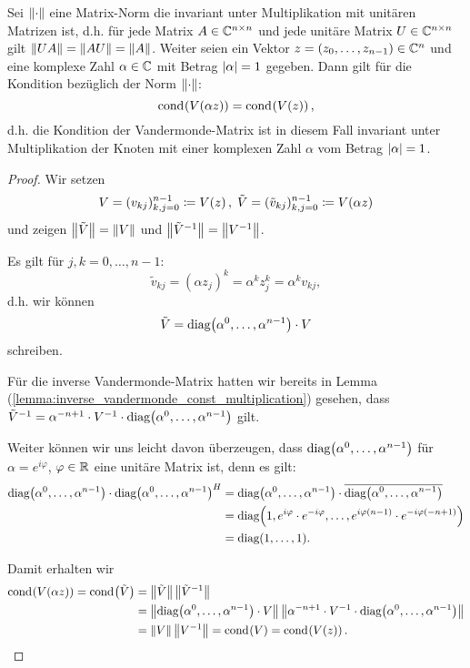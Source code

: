 \begin{lemma}
    Sei $\left\lVert \cdot \right\rVert$ eine Matrix-Norm die invariant unter Multiplikation mit unitären
    Matrizen ist, d.h. für jede Matrix $A \in \mathbb{C}^{n\times n}$ und jede
    unitäre Matrix $U \in \mathbb{C}^{n\times n}$ gilt $\left\lVert UA \right\rVert = \left\lVert AU \right\rVert = \left\lVert A \right\rVert$.
    Weiter seien ein Vektor $z = (z_0, \dots, z_{n-1}) \in \mathbb{C}^n$ und eine
    komplexe Zahl $\alpha \in \mathbb{C}$ mit Betrag $\left\lvert \alpha \right\rvert = 1$ gegeben.
    Dann gilt für die Kondition bezüglich der Norm $\left\lVert \cdot \right\rVert$:
    \[
        \text{cond}_{{}}\! \left( V \! \left( \alpha z \right) \right) = \text{cond}_{{}}\! \left( V \! \left( z \right) \right),
    \]
    d.h. die Kondition der Vandermonde-Matrix ist in diesem Fall invariant
    unter Multiplikation der Knoten mit einer komplexen Zahl $\alpha$ vom
    Betrag $\left\lvert \alpha \right\rvert = 1$.
\end{lemma}
\begin{proof}
    Wir setzen
    \[
        V = (v_{kj})_{k,j=0}^{n-1} \coloneqq V \! \left( z \right), \;
        \tilde{V} = (\tilde{v}_{kj})_{k,j=0}^{n-1} \coloneqq V \! \left( \alpha z \right)
    \]
    und zeigen $\left\lVert \tilde{V} \right\rVert = \left\lVert V \right\rVert$ und
    $\left\lVert \tilde{V}^{-1} \right\rVert = \left\lVert V^{-1} \right\rVert$.

    \noindent Es gilt für $j,k = 0,\dots,n-1$:
    \[
        \tilde{v}_{kj} = (\alpha z_j)^k = \alpha^k z_j^k = \alpha^k v_{kj},
    \]
    d.h. wir können
    \[
        \tilde{V} = \text{diag$ \left( \alpha^0, \dots, \alpha^{n-1} \right)$} \cdot V
    \]
    schreiben.

    \noindent Für die inverse Vandermonde-Matrix hatten wir bereits in
    Lemma (\ref{lemma:inverse_vandermonde_const_multiplication})
    gesehen, dass $ \tilde{V}^{-1} = \alpha^{-n+1} \cdot V^{-1} \cdot \text{diag$ \left( \alpha^{0}, \dots, \alpha^{n-1} \right)$} $ gilt.

    \noindent Weiter können wir uns leicht davon überzeugen, dass
    $\text{diag$ \left( \alpha^0, \dots, \alpha^{n-1} \right)$}$
    für $\alpha = e^{i\varphi}$, $\varphi \in \mathbb{R}$
    eine unitäre Matrix ist, denn es gilt:
    \[
        \begin{split}
               \text{diag$ \left( \alpha^0, \dots, \alpha^{n-1} \right)$} \cdot \text{diag$ \left( \alpha^0, \dots, \alpha^{n-1} \right)$}^{H}
            &= \text{diag$ \left( \alpha^0, \dots, \alpha^{n-1} \right)$} \cdot \overline{\text{diag$ \left( \alpha^0, \dots, \alpha^{n-1} \right)$}}\\
            &= \text{diag$ \left( 1, e^{i\varphi} \cdot e^{-i\varphi}, \dots, e^{i\varphi (n-1)} \cdot e^{-i \varphi (-n+1)} \right)$}\\
            &= \text{diag$ \left( 1, \dots, 1 \right)$}.
        \end{split}
    \]

    \noindent Damit erhalten wir
    \[
        \begin{split}
            \text{cond}_{{}}\! \left( V \! \left( \alpha z \right) \right)
            = \text{cond}_{{}}\! \left( \tilde{V} \right)
            &= \left\lVert \tilde{V} \right\rVert \left\lVert \tilde{V}^{-1} \right\rVert\\
            &= \left\lVert \text{diag$ \left( \alpha^0, \dots, \alpha^{n-1} \right)$} \cdot V \right\rVert \left\lVert \alpha^{-n+1} \cdot V^{-1} \cdot \text{diag$ \left( \alpha^0, \dots, \alpha^{n-1} \right)$} \right\rVert\\
            &= \left\lVert V \right\rVert \left\lVert V^{-1} \right\rVert
            = \text{cond}_{{}}\! \left( V \right) = \text{cond}_{{}}\! \left( V \! \left( z \right) \right).
        \end{split}
    \]
\end{proof}

